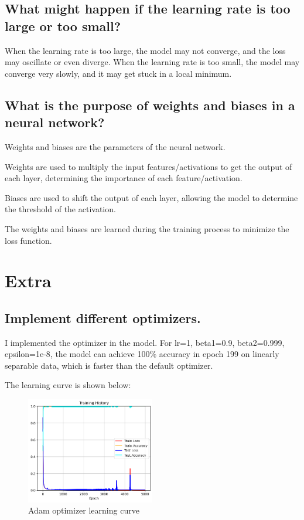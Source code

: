 \documentclass{homework}
\begin{document}
\subsection{What might happen if the learning rate is too large or too small?}

When the learning rate is too large, the model may not converge, and the loss may oscillate or even diverge. When the learning rate is too small, the model may converge very slowly, and it may get stuck in a local minimum.

\subsection{What is the purpose of weights and biases in a neural network?}

Weights and biases are the parameters of the neural network.

Weights are used to multiply the input features/activations to get the output of each layer, determining the importance of each feature/activation.

Biases are used to shift the output of each layer, allowing the model to determine the threshold of the activation.

The weights and biases are learned during the training process to minimize the loss function.

\section{Extra}

\subsection{Implement different optimizers.}

I implemented the  optimizer in the model. For lr=1, beta1=0.9, beta2=0.999, epsilon=1e-8, the model can achieve 100\% accuracy in epoch 199 on linearly separable data, which is faster than the default optimizer.

The learning curve is shown below:

\begin{figure}[H]
    \centering
    \includegraphics[width=0.5\textwidth]{linear_adam_curve.png}
    \caption{Adam optimizer learning curve}
\end{figure}
\end{document}
